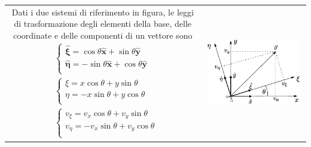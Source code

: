  \begin{tabular}{cc}
\begin{minipage}[t]{0.5\textwidth}
\vspace{0pt}
Dati i due sistemi di riferimento in figura, le leggi di trasformazione degli elementi della base, delle coordinate e 
delle componenti di un vettore sono
 \begin{equation}
 \begin{aligned}
 & \begin{cases}
   \bm{\hat{\xi}} =  \cos{\theta} \bm{\hat{x}} + \sin{\theta} \bm{\hat{y}} \\
   \bm{\hat{\eta}} = -\sin{\theta} \bm{\hat{x}} + \cos{\theta} \bm{\hat{y}} \\
  \end{cases}
  \\
 & \begin{cases}
   \xi  =  x \cos{\theta} + y \sin{\theta} \\
   \eta = -x \sin{\theta} + y \cos{\theta} \\
  \end{cases}
 \\
 & \begin{cases}
   v_\xi  =  v_x \cos{\theta} + v_y \sin{\theta} \\
   v_\eta = -v_x \sin{\theta} + v_y \cos{\theta} \\
  \end{cases}
 \end{aligned}
 \label{eqn:trEse}
 \end{equation}
\end{minipage}
&
\begin{minipage}[t]{0.5\textwidth}
\vspace{0pt}
\begin{center}
\includegraphics[width=0.95\textwidth]{./fig/rotation}
\end{center}
\end{minipage}
\end{tabular}
 
